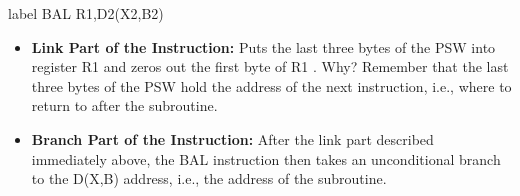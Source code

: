 \documentclass{report}
\begin{document}
\begin{itemize}
\begin{cppcode}
            label BAL R1,D2(X2,B2)
            \end{cppcode}
            \bigbreak \noindent 
            \begin{itemize}
                \item \textbf{Link Part of the Instruction:} Puts the last three bytes of the PSW into register R1 and zeros out the first byte of R1 . Why?
                \bigbreak \noindent 
                Remember that the last three bytes of the PSW hold the address of the next instruction, i.e., where to return to after the subroutine.
                \item \textbf{Branch Part of the Instruction:} After the link part described immediately above, the BAL instruction then takes an unconditional branch to the D(X,B) address, i.e., the address of the subroutine.
            \end{itemize}


    \end{itemize}

    \bigbreak \noindent 
\end{document}

